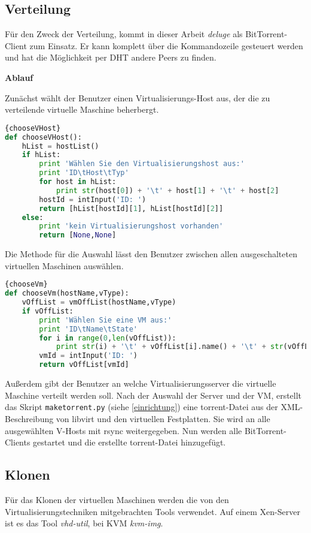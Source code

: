 \subsection{Verteilung}
Für den Zweck der Verteilung, kommt in dieser Arbeit \textit{deluge} als BitTorrent-Client zum Einsatz. Er kann komplett über die Kommandozeile gesteuert werden und hat die Möglichkeit per DHT andere Peers zu finden.

\textbf{Ablauf}

Zunächst wählt der Benutzer einen Virtualisierungs-Host aus, der die zu verteilende virtuelle Maschine beherbergt. 
\\
\begin{lstlisting}[caption=VHost-Auswahl,language=Python,label=chooseVHost]{chooseVHost}
def chooseVHost():
	hList = hostList()
	if hList:
		print 'Wählen Sie den Virtualisierungshost aus:'
		print 'ID\tHost\tTyp'
		for host in hList:
			print str(host[0]) + '\t' + host[1] + '\t' + host[2]
		hostId = intInput('ID: ')
		return [hList[hostId][1], hList[hostId][2]]
	else:
		print 'kein Virtualisierungshost vorhanden'
		return [None,None]
\end{lstlisting}

Die Methode für die Auswahl lässt den Benutzer zwischen allen ausgeschalteten virtuellen Maschinen auswählen.
\\
\begin{lstlisting}[caption=VM-Auswahl,language=Python, label=chooseVm]{chooseVm}
def chooseVm(hostName,vType):
	vOffList = vmOffList(hostName,vType)
	if vOffList:
		print 'Wählen Sie eine VM aus:'
		print 'ID\tName\tState'
		for i in range(0,len(vOffList)):
			print str(i) + '\t' + vOffList[i].name() + '\t' + str(vOffList[i].info()[0])
		vmId = intInput('ID: ')
		return vOffList[vmId]
\end{lstlisting}
Außerdem gibt der Benutzer an welche Virtualisierungsserver die virtuelle Maschine verteilt werden soll. Nach der Auswahl der Server und der VM, erstellt das Skript \lstinline|maketorrent.py| (siehe \ref{einrichtung}) eine torrent-Datei aus der XML-Beschreibung von libvirt und den virtuellen Festplatten. Sie wird an alle ausgewählten V-Hosts mit rsync weitergegeben. Nun werden alle BitTorrent-Clients gestartet und die erstellte torrent-Datei hinzugefügt.

\subsection{Klonen}
Für das Klonen der virtuellen Maschinen werden die von den Virtualisierungstechniken mitgebrachten Tools verwendet. Auf einem Xen-Server ist es das Tool \textit{vhd-util}, bei KVM \textit{kvm-img}. %

